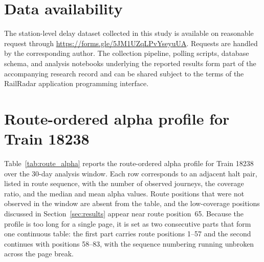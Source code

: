 \documentclass[a4paper,fleqn]{cas-dc}
\begin{document}
\section*{Data availability}

The station-level delay dataset collected in this study is available on
reasonable request through \url{https://forms.gle/5JM1UZqLPvYseyuUA}.
Requests are handled by the corresponding author. The collection pipeline,
polling scripts, database schema, and analysis notebooks underlying the
reported results form part of the accompanying research record and can be
shared subject to the terms of the RailRadar application programming
interface.

\appendix

\section{Route-ordered alpha profile for Train 18238}
\label{app:alpha}

Table~\ref{tab:route_alpha} reports the route-ordered alpha profile for Train
18238 over the 30-day analysis window. Each row corresponds to an adjacent
halt pair, listed in route sequence, with the number of observed journeys, the
coverage ratio, and the median and mean alpha values. Route positions that were
not observed in the window are absent from the table, and the low-coverage
positions discussed in Section~\ref{sec:results} appear near route
position~65. Because the profile is too long for a single page, it is set as
two consecutive parts that form one continuous table: the first part carries
route positions 1--57 and the second continues with positions 58--83, with the
sequence numbering running unbroken across the page break.
\end{document}
